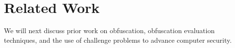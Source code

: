 \section{Related Work} \label{relatedwork}
We will next discuss prior work on obfuscation, obfuscation evaluation techniques, and the use of challenge problems to advance computer security.






